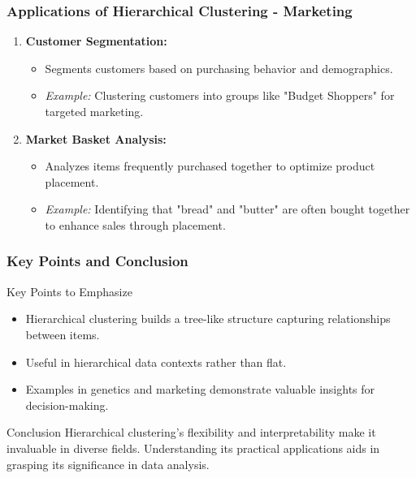 \documentclass[aspectratio=169]{beamer}
\begin{document}
\begin{frame}[fragile]
    \frametitle{Applications of Hierarchical Clustering - Marketing}
    \begin{enumerate}
        \item \textbf{Customer Segmentation:}
        \begin{itemize}
            \item Segments customers based on purchasing behavior and demographics.
            \item \textit{Example:} Clustering customers into groups like "Budget Shoppers" for targeted marketing.
        \end{itemize}

        \item \textbf{Market Basket Analysis:}
        \begin{itemize}
            \item Analyzes items frequently purchased together to optimize product placement.
            \item \textit{Example:} Identifying that "bread" and "butter" are often bought together to enhance sales through placement.
        \end{itemize}
    \end{enumerate}
\end{frame}

\begin{frame}[fragile]
    \frametitle{Key Points and Conclusion}
    \begin{block}{Key Points to Emphasize}
        \begin{itemize}
            \item Hierarchical clustering builds a tree-like structure capturing relationships between items.
            \item Useful in hierarchical data contexts rather than flat.
            \item Examples in genetics and marketing demonstrate valuable insights for decision-making.
        \end{itemize}
    \end{block}

    \begin{block}{Conclusion}
        Hierarchical clustering's flexibility and interpretability make it invaluable in diverse fields. Understanding its practical applications aids in grasping its significance in data analysis.
    \end{block}
\end{frame}
\end{document}
